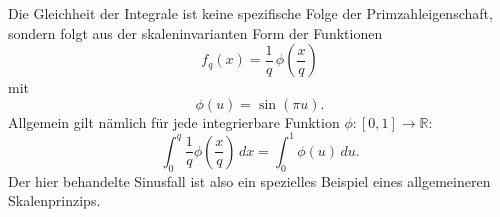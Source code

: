 \begin{bemerkung}
	Die Gleichheit der Integrale ist keine spezifische Folge der Primzahleigenschaft, sondern folgt aus der skaleninvarianten Form der Funktionen
	\[
	f_q(x)=\frac{1}{q}\,\phi\!\left(\frac{x}{q}\right)
	\]
	mit
	\[
	\phi(u)=\sin(\pi u).
	\]
	Allgemein gilt nämlich für jede integrierbare Funktion \(\phi:[0,1]\to\mathbb{R}\):
	\[
	\int_0^q \frac{1}{q}\phi\!\left(\frac{x}{q}\right)\,dx
	=
	\int_0^1 \phi(u)\,du.
	\]
	Der hier behandelte Sinusfall ist also ein spezielles Beispiel eines allgemeineren Skalenprinzips.
\end{bemerkung}